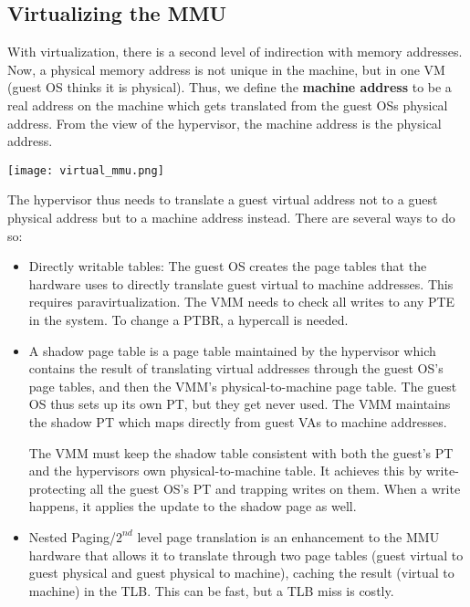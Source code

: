 \subsection{Virtualizing the MMU}

With virtualization, there is a second level of indirection with memory addresses. Now, a physical memory address is not unique in the machine, but in one VM (guest OS thinks it is physical). Thus, we define the \textbf{machine address} to be a real address on the machine which gets translated from the guest OSs physical address. From the view of the hypervisor, the machine address is the physical address.

\begin{center}
	\texttt{[image: virtual\_mmu.png]}
\end{center}

The hypervisor thus needs to translate a guest virtual address not to a guest physical address but to a machine address instead. There are several ways to do so:
\begin{itemize}
	\item Directly writable tables: The guest OS creates the page tables that the hardware uses to directly translate guest virtual to machine addresses. This requires paravirtualization. The VMM needs to check all writes to any PTE in the system. To change a PTBR, a hypercall is needed.
	\item A shadow page table is a page table maintained by the hypervisor which contains the result of translating virtual addresses through the guest OS’s page tables, and then the VMM’s physical-to-machine page table. The guest OS thus sets up its own PT, but they get never used. The VMM maintains the shadow PT which maps directly from guest VAs to machine addresses. \medskip
		
		The VMM must keep the shadow table consistent with both the guest’s PT and the hypervisors own physical-to-machine table. It achieves this by write-protecting all the guest OS's PT and trapping writes on them. When a write happens, it applies the update to the shadow page as well.
	\item Nested Paging/$2^{nd}$ level page translation is an enhancement to the MMU hardware that allows it to translate through two page tables (guest virtual to guest physical and guest physical to machine), caching the result (virtual to machine) in the TLB. This can be fast, but a TLB miss is costly.
\end{itemize}


